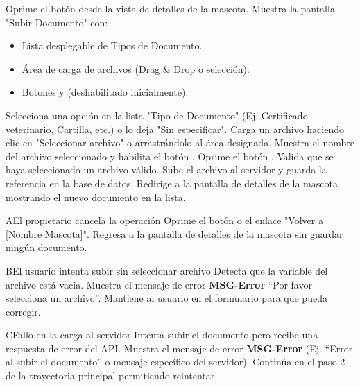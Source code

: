 \begin{UCtrayectoria}
    \UCpaso[\UCactor] Oprime el botón  desde la vista de detalles de la mascota.
    \UCpaso Muestra la pantalla "Subir Documento" con:
        \begin{itemize}
            \item Lista desplegable de Tipos de Documento.
            \item Área de carga de archivos (Drag \& Drop o selección).
            \item Botones  y  (deshabilitado inicialmente).
        \end{itemize}
    \UCpaso[\UCactor] Selecciona una opción en la lista "Tipo de Documento" (Ej. Certificado veterinario, Cartilla, etc.) o lo deja "Sin especificar".
    \UCpaso[\UCactor] Carga un archivo haciendo clic en "Seleccionar archivo" o arrastrándolo al área designada.
    \UCpaso Muestra el nombre del archivo seleccionado y habilita el botón .
    \UCpaso[\UCactor] Oprime el botón .
    \UCpaso Valida que se haya seleccionado un archivo válido.
    \UCpaso Sube el archivo al servidor y guarda la referencia en la base de datos.
    \UCpaso Redirige a la pantalla de detalles de la mascota mostrando el nuevo documento en la lista.
\end{UCtrayectoria}


\begin{UCtrayectoriaA}{A}{El propietario cancela la operación}
    \UCpaso[\UCactor] Oprime el botón  o el enlace "Volver a [Nombre Mascota]".
    \UCpaso Regresa a la pantalla de detalles de la mascota sin guardar ningún documento.
\end{UCtrayectoriaA}

\begin{UCtrayectoriaA}{B}{El usuario intenta subir sin seleccionar archivo}
    \UCpaso Detecta que la variable del archivo está vacía.
    \UCpaso Muestra el mensaje de error {\bf MSG-Error} ``Por favor selecciona un archivo''.
    \UCpaso Mantiene al usuario en el formulario para que pueda corregir.
\end{UCtrayectoriaA}

\begin{UCtrayectoriaA}{C}{Fallo en la carga al servidor}
    \UCpaso Intenta subir el documento pero recibe una respuesta de error del API.
    \UCpaso Muestra el mensaje de error {\bf MSG-Error} (Ej. ``Error al subir el documento'' o mensaje específico del servidor).
    \UCpaso Continúa en el paso 2 de la trayectoria principal permitiendo reintentar.
\end{UCtrayectoriaA}